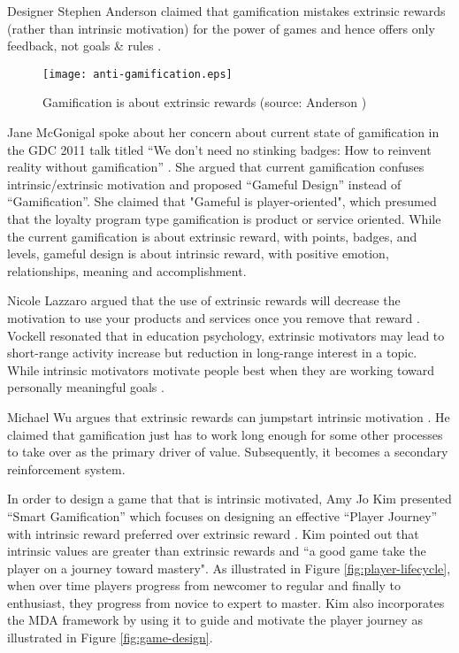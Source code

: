 Designer Stephen Anderson claimed that gamification mistakes extrinsic rewards (rather than intrinsic motivation) for the power of games and hence offers only feedback, not goals \& rules \cite {anderson2011}. 

\begin{figure}[ht!]
	\centering
		\texttt{[image: anti-gamification.eps]}
		\caption{Gamification is about extrinsic rewards (source: Anderson \cite {anderson2011})}
		\label{fig:anti-gamification}
\end{figure}

Jane McGonigal spoke about her concern about current state of gamification in the GDC 2011 talk titled ``We don't need no stinking badges: How to reinvent reality without gamification'' \cite {mcgonigal2011}. She argued that current gamification confuses intrinsic/extrinsic motivation and proposed ``Gameful Design'' instead of ``Gamification''. She claimed that "Gameful is player-oriented", which presumed that the loyalty program type gamification is product or service oriented. While the current gamification is about extrinsic reward, with points, badges, and levels, gameful design is about intrinsic reward, with positive emotion, relationships, meaning and accomplishment.

Nicole Lazzaro argued that the use of extrinsic rewards will decrease the motivation to use your products and services once you remove that reward \cite {Lazzaro2011}. Vockell resonated that in education psychology, extrinsic motivators may lead to short-range activity increase but reduction in long-range interest in a topic. While intrinsic motivators motivate people best when they are working toward personally meaningful goals \cite{vockell2004educational}. 

Michael Wu argues that extrinsic rewards can jumpstart intrinsic motivation  \cite {WuSustainable2011}. He claimed that gamification just has to work long enough for some other processes to take over as the primary driver of value. Subsequently, it becomes a secondary reinforcement system. 

In order to design a game that that is intrinsic motivated, Amy Jo Kim presented ``Smart Gamification'' which focuses on designing an effective ``Player Journey'' with intrinsic reward preferred over extrinsic reward \cite {Kim2010}. Kim pointed out that intrinsic values are greater than extrinsic rewards and ``a good game take the player on a journey toward mastery". As illustrated in Figure \autoref{fig:player-lifecycle}, when over time players progress from newcomer to regular and finally to enthusiast, they progress from novice to expert to master. Kim also incorporates the MDA framework \cite {hunicke2004mda} by using it to guide and motivate the player journey as illustrated in Figure \autoref{fig:game-design}.

